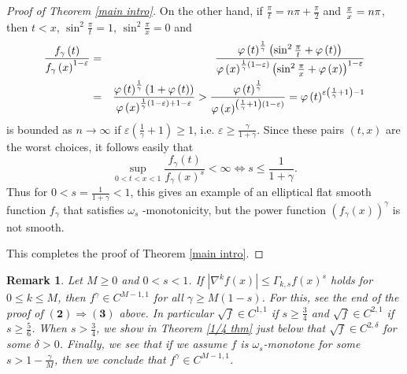 \documentclass{amsart}
\theoremstyle{plain}
\newtheorem{remark}[theorem]{Remark}
\numberwithin{equation}{section}
\begin{document}
\begin{proof}[Proof of Theorem \protect\ref{main intro}]
On the other hand, if $\frac{\pi }{t}=n\pi +\frac{\pi }{2}$ and $\frac{\pi }{%
x}=n\pi $, then $t<x$, $\sin ^{2}\frac{\pi }{t}=1$, $\sin ^{2}\frac{\pi }{x}%
=0$ and 
\begin{eqnarray*}
\frac{f_{\gamma }\left( t\right) }{f_{\gamma }\left( x\right)
^{1-\varepsilon }} &=&\frac{\varphi \left( t\right) ^{\frac{1}{\gamma }%
}\left( \sin ^{2}\frac{\pi }{t}+\varphi \left( t\right) \right) }{\varphi
\left( x\right) ^{\frac{1}{\gamma }\left( 1-\varepsilon \right) }\left( \sin
^{2}\frac{\pi }{x}+\varphi \left( x\right) \right) ^{1-\varepsilon }} \\
&=&\frac{\varphi \left( t\right) ^{\frac{1}{\gamma }}\left( 1+\varphi \left(
t\right) \right) }{\varphi \left( x\right) ^{\frac{1}{\gamma }\left(
1-\varepsilon \right) +1-\varepsilon }}>\frac{\varphi \left( t\right) ^{%
\frac{1}{\gamma }}}{\varphi \left( x\right) ^{\left( \frac{1}{\gamma }%
+1\right) \left( 1-\varepsilon \right) }}=\varphi \left( t\right)
^{\varepsilon \left( \frac{1}{\gamma }+1\right) -1}
\end{eqnarray*}%
is bounded as $n\rightarrow \infty $ if $\varepsilon \left( \frac{1}{\gamma }%
+1\right) \geq 1$, i.e. $\varepsilon \geq \frac{\gamma }{1+\gamma }$. Since
these pairs $\left( t,x\right) $ are the worst choices, it follows easily
that%
\begin{equation*}
\sup_{0<t<x<1}\frac{f_{\gamma }\left( t\right) }{f_{\gamma }\left( x\right)
^{s}}<\infty \Longleftrightarrow s\leq \frac{1}{1+\gamma }.
\end{equation*}%
Thus for $0<s=\frac{1}{1+\gamma }<1$, this gives an example of an elliptical
flat smooth function $f_{\gamma }$ that satisfies $\omega _{s}$%
-monotonicity, but the power function $\left( f_{\gamma }\left( x\right)
\right) ^{\gamma }$ is not smooth.

This completes the proof of Theorem \ref{main intro}.
\end{proof}

\begin{remark}
\label{main remark}Let $M\geq 0$ and $0<s<1$. If $\left\vert \nabla
^{k}f\left( x\right) \right\vert \leq \Gamma _{k,s}f\left( x\right) ^{s}$
holds for $0\leq k\leq M$, then $f^{\gamma }\in C^{M-1,1}$ for all $\gamma
\geq M\left( 1-s\right) $. For this, see the end of the proof of $\left( 
\mathbf{2}\right) \mathbf{\Longrightarrow }\left( \mathbf{3}\right) $ above.
In particular $\sqrt{f}\in C^{1,1}$ if $s\geq \frac{3}{4}$ and $\sqrt{f}\in
C^{2,1}$ if $s\geq \frac{5}{6}$. When $s>\frac{3}{4}$, we show in Theorem %
\ref{1/4 thm} just below that $\sqrt{f}\in C^{2,\delta }$ for some $\delta
>0 $. Finally, we see that if we assume $f$ is $\omega _{s}$-monotone for
some $s>1-\frac{\gamma }{M}$, then we conclude that $f^{\gamma }\in
C^{M-1,1} $.
\end{remark}
\end{document}
